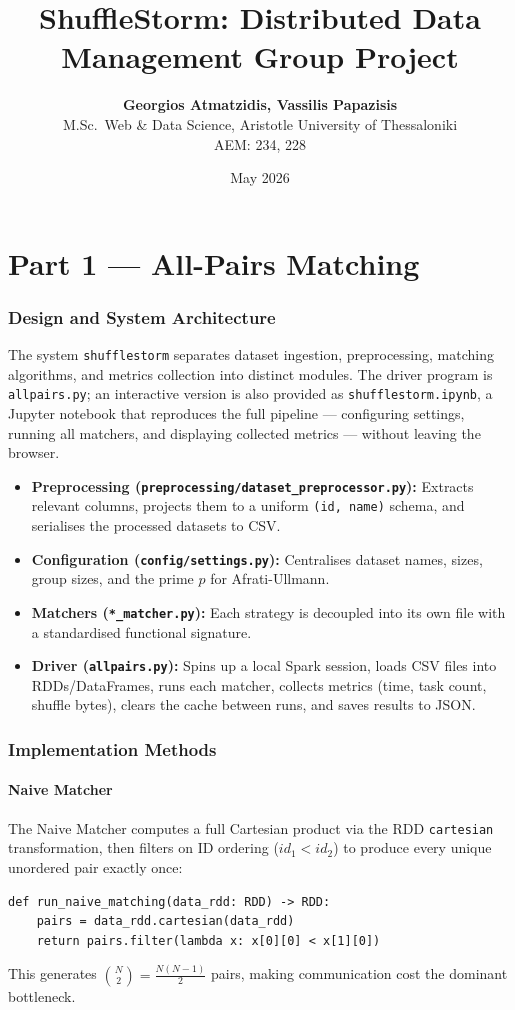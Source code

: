 \documentclass[11pt,a4paper]{article}
\title{\textbf{ShuffleStorm: Distributed Data Management Group Project}}
\author{\textbf{Georgios Atmatzidis, Vassilis Papazisis} \\ M.Sc.\ Web \& Data Science, Aristotle University of Thessaloniki \\ AEM: 234, 228}
\date{May 2026}
\begin{document}
\maketitle

\part*{Part 1 — All-Pairs Matching}

\section*{Design and System Architecture}
The system \texttt{shufflestorm} separates dataset ingestion, preprocessing, matching algorithms, and metrics collection into distinct modules. The driver program is \texttt{allpairs.py}; an interactive version is also provided as \texttt{shufflestorm.ipynb}, a Jupyter notebook that reproduces the full pipeline — configuring settings, running all matchers, and displaying collected metrics — without leaving the browser.
\begin{itemize}
    \item \textbf{Preprocessing (\texttt{preprocessing/dataset\_preprocessor.py}):} Extracts relevant columns, projects them to a uniform \texttt{(id, name)} schema, and serialises the processed datasets to CSV.
    \item \textbf{Configuration (\texttt{config/settings.py}):} Centralises dataset names, sizes, group sizes, and the prime $p$ for Afrati-Ullmann.
    \item \textbf{Matchers (\texttt{*\_matcher.py}):} Each strategy is decoupled into its own file with a standardised functional signature.
    \item \textbf{Driver (\texttt{allpairs.py}):} Spins up a local Spark session, loads CSV files into RDDs/DataFrames, runs each matcher, collects metrics (time, task count, shuffle bytes), clears the cache between runs, and saves results to JSON.
\end{itemize}

\section*{Implementation Methods}

\subsection*{Naive Matcher}
The Naive Matcher computes a full Cartesian product via the RDD \texttt{cartesian} transformation, then filters on ID ordering ($id_1 < id_2$) to produce every unique unordered pair exactly once:
\begin{lstlisting}[caption=Naive Matcher]
def run_naive_matching(data_rdd: RDD) -> RDD:
    pairs = data_rdd.cartesian(data_rdd)
    return pairs.filter(lambda x: x[0][0] < x[1][0])
\end{lstlisting}
This generates $\binom{N}{2} = \frac{N(N-1)}{2}$ pairs, making communication cost the dominant bottleneck.
\end{document}
